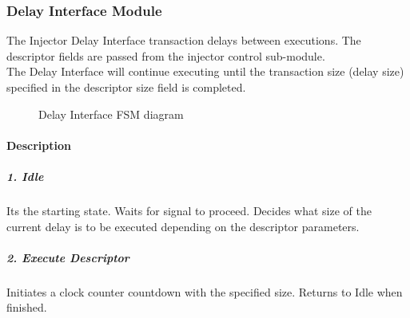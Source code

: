 \subsubsection{Delay Interface Module}
The Injector Delay Interface transaction delays between executions. The descriptor fields are passed from the injector control sub-module.\\
The Delay Interface will continue executing until the transaction size (delay size) specified in the descriptor size field is completed.\\

\begin{figure}[ht]
	\centering
	\caption{Delay Interface FSM diagram}
	\label{fig:read_states}
\end{figure}

\paragraph{Description}
\subparagraph{1. Idle}
Its the starting state. Waits for  signal to proceed. Decides what size of the current delay is to be executed depending on the descriptor parameters.

\subparagraph{2. Execute Descriptor}
Initiates a clock counter countdown with the specified size. Returns to Idle when finished.

\vspace{1cm}